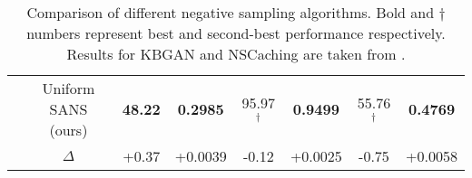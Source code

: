 {\begin{table*}[h]
\begin{small}
\begin{tabular}{cccccccc}
& Uniform SANS (ours) & \textbf{48.22 }& \textbf{0.2985} & 95.97$^\dagger$ & \textbf{0.9499} & 55.76$^\dagger$ & \textbf{0.4769} \\
& $\Delta$ & \cellcolor{palegreen}+0.37 & \cellcolor{palegreen}+0.0039 & \cellcolor{mistyrose}-0.12 & \cellcolor{palegreen}+0.0025 & \cellcolor{mistyrose}-0.75 & \cellcolor{palegreen}+0.0058\\
\hline
\end{tabular}
\caption{Comparison of different negative sampling algorithms. Bold and $\dagger$ numbers represent best and second-best performance respectively. Results for KBGAN and NSCaching are taken from \cite{zhang2019nscaching}.
}
\label{tab:unisota_comp}
\end{small}
\end{table*}}